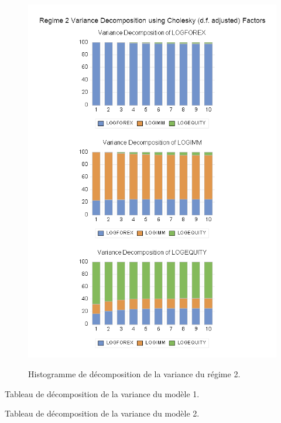 \begin{figure}[H]
    \centering
    \caption{Histogramme de décomposition de la variance du régime 2.}
    \includegraphics[scale=0.9]{annexes/regime_2.png}
    \label{fig:hist_variance_r2}
\end{figure}

\begin{table}[H]
    \centering
    \sffamily
    \caption{Tableau de décomposition de la variance du modèle 1.}
    \label{tab:tab_variance_r1}
    \resizebox{1\textwidth}{!}{}
\end{table}

\begin{table}[H]
    \centering
    \sffamily
    \caption{Tableau de décomposition de la variance du modèle 2.}
    \label{tab:tab_variance_r2}
    \resizebox{1\textwidth}{!}{}
\end{table}

